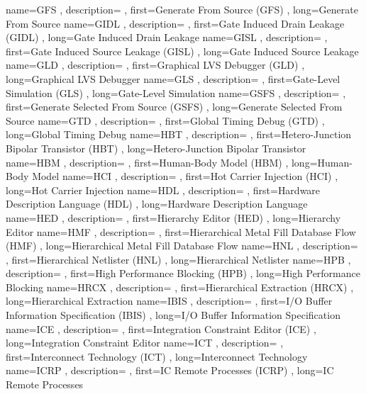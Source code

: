 { name={GFS}
, description={}
, first={Generate From Source (GFS)}
, long={Generate From Source}
}
{ name={GIDL}
, description={}
, first={Gate Induced Drain Leakage (GIDL)}
, long={Gate Induced Drain Leakage}
}
{ name={GISL}
, description={}
, first={Gate Induced Source Leakage (GISL)}
, long={Gate Induced Source Leakage}
}
{ name={GLD}
, description={}
, first={Graphical LVS Debugger (GLD)}
, long={Graphical LVS Debugger}
}
{ name={GLS}
, description={}
, first={Gate-Level Simulation (GLS)}
, long={Gate-Level Simulation}
}
{ name={GSFS}
, description={}
, first={Generate Selected From Source (GSFS)}
, long={Generate Selected From Source}
}
{ name={GTD}
, description={}
, first={Global Timing Debug (GTD)}
, long={Global Timing Debug}
}
{ name={HBT}
, description={}
, first={Hetero-Junction Bipolar Transistor (HBT)}
, long={Hetero-Junction Bipolar Transistor}
}
{ name={HBM}
, description={}
, first={Human-Body Model (HBM)}
, long={Human-Body Model}
}
{ name={HCI}
, description={}
, first={Hot Carrier Injection (HCI)}
, long={Hot Carrier Injection}
}
{ name={HDL}
, description={}
, first={Hardware Description Language (HDL)}
, long={Hardware Description Language}
}
{ name={HED}
, description={}
, first={Hierarchy Editor (HED)}
, long={Hierarchy Editor}
}
{ name={HMF}
, description={}
, first={Hierarchical Metal Fill Database Flow (HMF)}
, long={Hierarchical Metal Fill Database Flow}
}
{ name={HNL}
, description={}
, first={Hierarchical Netlister (HNL)}
, long={Hierarchical Netlister}
}
{ name={HPB}
, description={}
, first={High Performance Blocking (HPB)}
, long={High Performance Blocking}
}
{ name={HRCX}
, description={}
, first={Hierarchical Extraction (HRCX)}
, long={Hierarchical Extraction}
}
{ name={IBIS}
, description={}
, first={I/O Buffer Information Specification (IBIS)}
, long={I/O Buffer Information Specification}
}
{ name={ICE}
, description={}
, first={Integration Constraint Editor (ICE)}
, long={Integration Constraint Editor}
}
{ name={ICT}
, description={}
, first={Interconnect Technology (ICT)}
, long={Interconnect Technology}
}
{ name={ICRP}
, description={}
, first={IC Remote Processes (ICRP)}
, long={IC Remote Processes}
}
